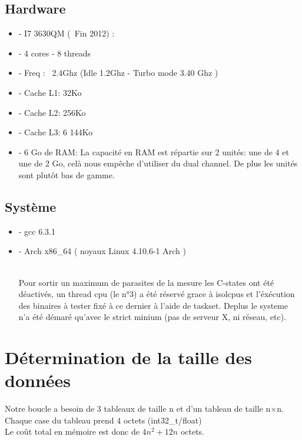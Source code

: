 \documentclass[a4paper]{report}
\begin{document}
\subsection*{Hardware}

\begin{itemize}
    \item{- I7 3630QM (~Fin 2012) :}
    \item{- 4 cores - 8 threads}
    \item{- Freq : ~2.4Ghz (Idle 1.2Ghz - Turbo mode 3.40 Ghz )}
    \item{- Cache L1: 32Ko}
    \item{- Cache L2: 256Ko}
    \item{- Cache L3: 6 144Ko}
    \item{- 6 Go de RAM:  La capacité en RAM est répartie sur 2 unités: une de 4 et une de 2 Go, celà nous empêche d'utiliser du dual channel. De plus les unités sont plutôt bas de gamme.}
\end{itemize}

\subsection*{Système}

\begin{itemize}
    \item{- gcc 6.3.1}
    \item{- Arch x86\_64 ( noyaux Linux 4.10.6-1 Arch )}
    
     \\Pour sortir un maximum de parasites de la mesure les C-states ont été déactivés, un thread cpu (le n°3) a été réservé grace à isolcpus et l'éxécution des binaires à tester fixé à ce dernier à l'aide de taskset. Deplus le systeme n'a été démaré qu'avec le strict minium (pas de serveur X, ni réseau, etc).
\end{itemize}

\section*{Détermination de la taille des données}

Notre boucle a besoin de 3 tableaux de taille n et d'un tableau de taille n$\times$n.\\
Chaque case du tableau prend 4 octets (int32\_t/float)\\
Le coût total en mémoire est donc de $4n^2+12n$ octets.\\
\end{document}
